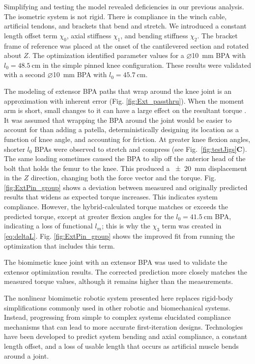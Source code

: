 Simplifying and testing the model revealed deficiencies in our previous analysis. The isometric system is not rigid. There is compliance in the winch cable, artificial tendons, and brackets that bend and stretch. We introduced a constant length offset term $\chi_{0}$, axial stiffness $\chi_{1}$, and bending stiffness $\chi_{2}$. The bracket frame of reference was placed at the onset of the cantilevered section and rotated about $Z$.  The optimization identified parameter values for a $\diameter$\qty{10}{\mm} BPA with $l_{0}=\qty{48.5}{\cm}$ in the simple pinned knee configuration. These results were validated with a second $\diameter$\qty{10}{\mm} BPA with $l_{0}=\qty{45.7}{\cm}$.

The modeling of extensor BPA paths that wrap around the knee joint is an approximation with inherent error (Fig. \ref{fig:Ext_passthru}). When the moment arm is short, small changes to it can have a large effect on the resultant torque \citep{young_analyzing_2019}. It was assumed that wrapping the BPA around the joint would be easier to account for than adding a patella, deterministically designing its location as a function of knee angle, and accounting for friction. At greater knee flexion angles, shorter $l_{0}$ BPAs were observed to stretch and compress (see Fig.~\ref{fig:testJigs}\textbf{C}). The same loading sometimes caused the BPA to slip off the anterior head of the bolt that holds the femur to the knee. This produced a \qty{\pm 20}{\mm} displacement in the $Z$ direction, changing both the force vector and the torque. Fig. \ref{fig:ExtPin_group} shows a deviation between measured and originally predicted results that widens as expected torque increases. This indicates system compliance. However, the hybrid-calculated torque matches or exceeds the predicted torque, except at greater flexion angles for the $l_{0}=\qty{41.5}{\cm}$ BPA, indicating a loss of functional $l_m$; this is why the $\chi_{3}$ term was created in \eqref{eq:deltaL}. Fig. \ref{fig:ExtPin_group} shows the improved fit from running the optimization that includes this term.

The biomimetic knee joint with an extensor BPA was used to validate the extensor optimization results. The corrected prediction more closely matches the measured torque values, although it remains higher than the measurements.


The nonlinear biomimetic robotic system presented here replaces rigid-body simplifications commonly used in other robotic and biomechanical systems. Instead, progressing from simple to complex systems elucidated compliance mechanisms that can lead to more accurate first-iteration designs. Technologies have been developed to predict system bending and axial compliance, a constant length offset, and a loss of usable length that occurs as artificial muscle bends around a joint. 

